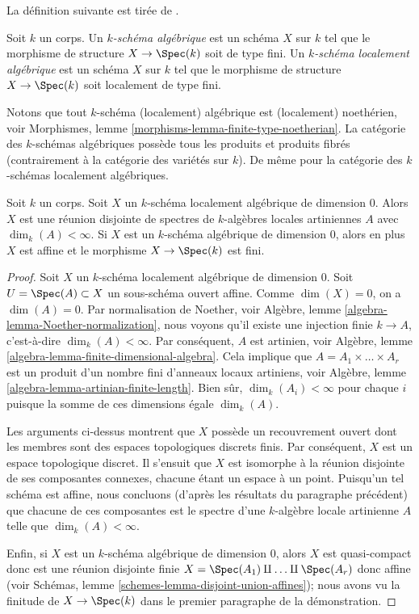 \noindent
La définition suivante est tirée de
\cite[I, définition 6.4.1]{EGA}.

\begin{definition}
\label{definition-algebraic-scheme}
Soit $k$ un corps. Un {\it $k$-schéma
algébrique} est un schéma $X$ sur $k$ tel que le morphisme de
structure $X \to \Spec(k)$ soit de type fini. Un {\it $k$-schéma
localement algébrique} est un schéma $X$ sur $k$ tel que le
morphisme de structure $X \to \Spec(k)$ soit localement de type fini.
\end{definition}

\noindent
Notons que tout $k$-schéma (localement) algébrique est (localement)
noethérien, voir Morphismes, lemme
\ref{morphisms-lemma-finite-type-noetherian}. La catégorie des $k$-schémas
algébriques possède tous les produits et produits fibrés (contrairement à la catégorie
des variétés sur $k$). De même pour la catégorie des $k$-schémas localement algébriques.

\begin{lemma}
\label{lemma-algebraic-scheme-dim-0}
Soit $k$ un corps. Soit $X$ un $k$-schéma
localement algébrique de dimension $0$. Alors $X$ est une réunion
disjointe de spectres de $k$-algèbres locales artiniennes $A$ avec
$\dim_k(A) < \infty$. Si $X$ est un $k$-schéma algébrique de dimension
$0$, alors en plus $X$ est affine et le morphisme $X \to \Spec(k)$ est fini.
\end{lemma}

\begin{proof}
Soit $X$ un $k$-schéma localement algébrique
de dimension $0$. Soit $U = \Spec(A) \subset X$
un sous-schéma ouvert affine. Comme $\dim(X) = 0$, on
a $\dim(A) = 0$. Par normalisation de Noether,
voir Algèbre, lemme
\ref{algebra-lemma-Noether-normalization}, nous voyons qu'il
existe une injection finie $k \to A$, c'est-à-dire $\dim_k(A) <
\infty$. Par conséquent, $A$ est artinien, voir Algèbre, lemme
\ref{algebra-lemma-finite-dimensional-algebra}. Cela implique que
$A = A_1 \times \ldots \times A_r$ est un produit d'un nombre
fini d'anneaux locaux artiniens, voir Algèbre, lemme
\ref{algebra-lemma-artinian-finite-length}. Bien sûr, $\dim_k(A_i) <
\infty$ pour chaque $i$ puisque la somme de ces dimensions égale $\dim_k(A)$.

\medskip\noindent
Les arguments ci-dessus montrent que $X$ possède un recouvrement ouvert
dont les membres sont des espaces topologiques discrets finis. Par
conséquent, $X$ est un espace topologique discret. Il s'ensuit que $X$ est
isomorphe à la réunion disjointe de ses composantes connexes, chacune étant un
espace à un point. Puisqu'un tel schéma est affine, nous concluons (d'après
les résultats du paragraphe précédent) que chacune de ces composantes est le
spectre d'une $k$-algèbre locale artinienne $A$ telle que $\dim_k(A) < \infty$.

\medskip\noindent
Enfin, si $X$ est un $k$-schéma algébrique de
dimension $0$, alors $X$ est quasi-compact donc
est une réunion disjointe finie $X = \Spec(A_1)
\amalg \ldots \amalg \Spec(A_r)$ donc affine (voir
Schémas, lemme
\ref{schemes-lemma-disjoint-union-affines}); nous avons vu la
finitude de $X \to \Spec(k)$ dans le premier paragraphe de la démonstration.
\end{proof}

